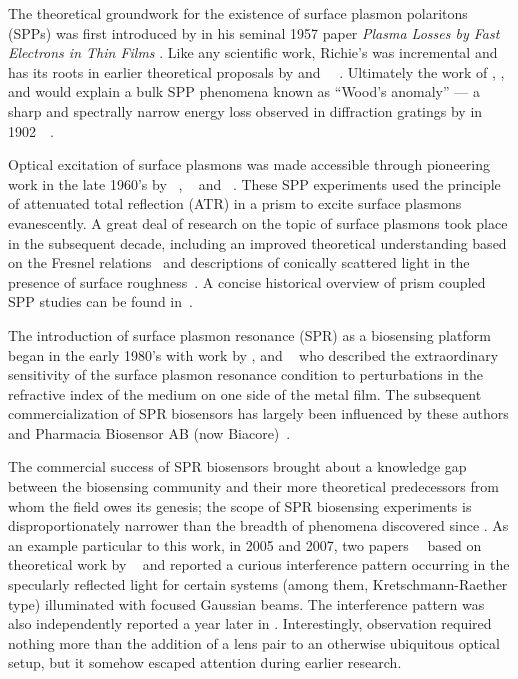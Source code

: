 The theoretical groundwork for the existence of surface plasmon polaritons
(SPPs) was first introduced by  in his seminal 1957 paper
\textit{Plasma Losses by Fast Electrons in Thin Films}
\cite{ritchie1957plasma}.  Like any scientific work, Richie's was
incremental and has its roots in earlier theoretical proposals by
 and
~\cite{bohm1951collective}~\cite{pines1952collective}.
Ultimately the work of , , and  would
explain a bulk SPP phenomena known as ``Wood's anomaly'' --- a sharp and
spectrally narrow energy loss observed in diffraction gratings by
 in
1902~\cite{wood1902remarkable}~\cite{rayleigh1907remarkable}.

Optical excitation of surface plasmons was made accessible through
pioneering work in the late 1960's by
~\cite{kretschmann1968},
~\cite{raether1988springer} and
~\cite{otto1968excitation}.  These SPP experiments used the
principle of attenuated total reflection (ATR) in a prism to excite surface
plasmons evanescently.  A great deal of research on the topic of surface
plasmons took place in the subsequent decade, including an improved
theoretical understanding based on the Fresnel
relations~\cite{chen1976excitation} and descriptions of conically scattered
light in the presence of surface roughness~\cite{simon1976directional}.  A
concise historical overview of prism coupled SPP studies can be found
in~\cite{raether1997surface}.

The introduction of surface plasmon resonance (SPR) as a biosensing
platform began in the early 1980's with work by ,
 and ~\cite{liedberg1983surface} who
described the extraordinary sensitivity of the surface plasmon resonance
condition to perturbations in the refractive index of the medium on one
side of the metal film.  The subsequent commercialization of SPR biosensors
has largely been influenced by these authors and Pharmacia Biosensor AB
(now Biacore)~\cite{liedberg1995biosensing}.

The commercial success of SPR biosensors brought about a knowledge gap
between the biosensing community and their more theoretical predecessors
from whom the field owes its genesis; the scope of SPR biosensing
experiments is disproportionately narrower than the breadth of phenomena
discovered since .  As an example particular to this work, in
2005 and 2007, two
papers~\cite{andaloro2005optical}~\cite{simon2007observation} based on
theoretical work by ~\cite{chuang1986lateral} and 
\cite{chen1976excitation} reported a curious interference pattern occurring
in the specularly reflected light for certain systems (among them,
Kretschmann-Raether type) illuminated with focused Gaussian beams.  The
interference pattern was also independently reported a year later in
\cite{schumann2008near}.  Interestingly, observation required nothing more
than the addition of a lens pair to an otherwise ubiquitous optical setup,
but it somehow escaped attention during earlier research.  

